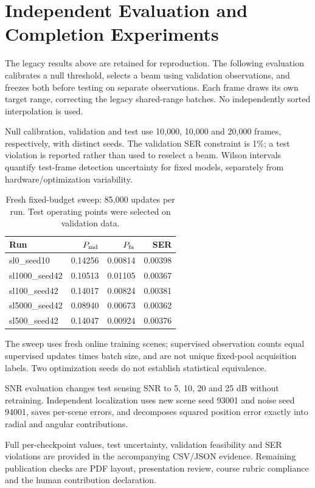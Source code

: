 \section{Independent Evaluation and Completion Experiments}

The legacy results above are retained for reproduction. The following evaluation calibrates a null threshold, selects a beam using validation observations, and freezes both before testing on separate observations. Each frame draws its own target range, correcting the legacy shared-range batches. No independently sorted interpolation is used.

Null calibration, validation and test use 10,000, 10,000 and 20,000 frames, respectively, with distinct seeds. The validation SER constraint is 1\%; a test violation is reported rather than used to reselect a beam. Wilson intervals quantify test-frame detection uncertainty for fixed models, separately from hardware/optimization variability.

\begin{table}[t]\centering\small\caption{Fresh fixed-budget sweep: 85,000 updates per run. Test operating points were selected on validation data.}

\begin{tabular}{lrrr}\toprule Run & $P_{\rm md}$ & $P_{\rm fa}$ & SER\\\midrule

sl0\_seed10 & 0.14256 & 0.00814 & 0.00398 \\

sl1000\_seed42 & 0.10513 & 0.01105 & 0.00367 \\

sl100\_seed42 & 0.14017 & 0.00824 & 0.00381 \\

sl5000\_seed42 & 0.08940 & 0.00673 & 0.00362 \\

sl500\_seed42 & 0.14047 & 0.00924 & 0.00376 \\

\bottomrule\end{tabular}\end{table}

The sweep uses fresh online training scenes; supervised observation counts equal supervised updates times batch size, and are not unique fixed-pool acquisition labels. Two optimization seeds do not establish statistical equivalence.

SNR evaluation changes test sensing SNR to 5, 10, 20 and 25 dB without retraining. Independent localization uses new scene seed 93001 and noise seed 94001, saves per-scene errors, and decomposes squared position error exactly into radial and angular contributions.

Full per-checkpoint values, test uncertainty, validation feasibility and SER violations are provided in the accompanying CSV/JSON evidence. Remaining publication checks are PDF layout, presentation review, course rubric compliance and the human contribution declaration.